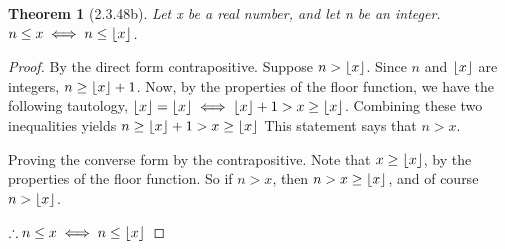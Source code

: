 \documentclass[a4paper, 12pt]{article}
\theoremstyle{plain}
\newtheorem*{theorem*}{Theorem}
\DeclarePairedDelimiter{\floor}{\lfloor}{\rfloor}
\begin{document}
	
	\begin{theorem*}[2.3.48b]
		Let x be a real number, and let n be an integer. \newline $n \le x \iff n \le \floor{x}$.
	\end{theorem*}
	
	\begin{proof}
		By the direct form contrapositive. Suppose $n > \floor{x}$. Since $n$ and $\floor{x}$ are integers, $n \ge \floor{x} + 1$. Now, by the properties of the floor function, we have the following tautology, $\floor{x} = \floor{x} \iff \floor{x} + 1 > x \ge \floor{x}$. Combining these two inequalities yields $n \ge \floor{x} + 1 > x \ge \floor{x}$ This statement says that $n > x$.
		
		Proving the converse form by the contrapositive. Note that $x \ge \floor{x}$, by the properties of the floor function. So if $n > x$, then $n > x \ge \floor{x}$, and of course $n > \floor{x}$.
		
		$\therefore n \le x \iff n \le \floor{x}$
	\end{proof}
\end{document}
